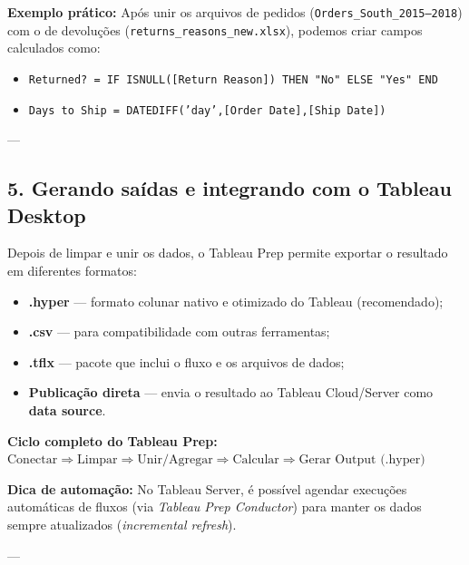 \begin{NoteBox}
\textbf{Exemplo prático:}  
Após unir os arquivos de pedidos (\texttt{Orders\_South\_2015–2018}) com o de devoluções (\texttt{returns\_reasons\_new.xlsx}),  
podemos criar campos calculados como:
\begin{itemize}[leftmargin=*]
  \item \texttt{Returned? = IF ISNULL([Return Reason]) THEN "No" ELSE "Yes" END}
  \item \texttt{Days to Ship = DATEDIFF('day',[Order Date],[Ship Date])}
\end{itemize}
\end{NoteBox}

---

\subsection*{5. Gerando saídas e integrando com o Tableau Desktop}

Depois de limpar e unir os dados, o Tableau Prep permite exportar o resultado em diferentes formatos:

\begin{itemize}[leftmargin=*]
  \item \textbf{.hyper} — formato colunar nativo e otimizado do Tableau (recomendado);
  \item \textbf{.csv} — para compatibilidade com outras ferramentas;
  \item \textbf{.tflx} — pacote que inclui o fluxo e os arquivos de dados;
  \item \textbf{Publicação direta} — envia o resultado ao Tableau Cloud/Server como \textbf{data source}.
\end{itemize}

\begin{FormulaBox}
\textbf{Ciclo completo do Tableau Prep:}\\[3pt]
\(\text{Conectar} \Rightarrow \text{Limpar} \Rightarrow \text{Unir/Agregar} \Rightarrow \text{Calcular} \Rightarrow \text{Gerar Output (.hyper)}\)
\end{FormulaBox}

\begin{NoteBox}
\textbf{Dica de automação:}  
No Tableau Server, é possível agendar execuções automáticas de fluxos (via \textit{Tableau Prep Conductor})  
para manter os dados sempre atualizados (\textit{incremental refresh}).
\end{NoteBox}

---

